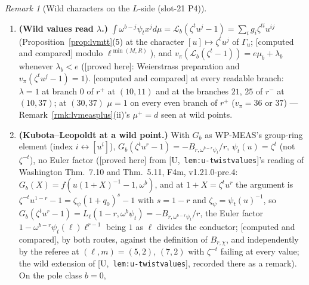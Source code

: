 \documentclass[11pt]{article}
\theoremstyle{remark}
\newtheorem{remark}[theorem]{Remark}
\newcommand{\Ga}{\Gamma}
\newcommand{\PROVED}{\textsf{[proved here]}}
\newcommand{\CMPD}{\textsf{[computed and compared]}}   %
\newcommand{\Ucite}[1]{[U,~\texttt{#1}]}               %
\begin{document}
\begin{remark}[Wild characters on the $L$-side (slot-21 P4)]
\begin{enumerate}
  $\Phi(\{a/F,\infty\})=-\rho_n(\gamma)\Phi(\{u/F,\infty\})$, and $\gamma_{a,m}\gamma=S\,\gamma_{u,m}$ with $S=\bigl(\begin{smallmatrix}0&-1\\1&0\end{smallmatrix}\bigr)$, while
  $\langle\rho_n(S)v,u^{\vee}_{n-j}\rangle=(-1)^{j}\langle v,u^{\vee}_{j}\rangle$ ($u_t\mapsto(-1)^{t}u_{n-t}$); summing against $\bar\chi(a)=\chi(-1)\chi(u)$ gives
  $\lambda_{\chi,j}(P)=-\chi(-1)(-1)^{j}\lambda_{\bar\chi,n-j}(P)$ for \emph{every} $P\in W$, which is $-\varepsilon\lambda_{\bar\chi,n-j}(P)$ wherever either side is non-zero
  ($\chi(-1)(-1)^{j}=\varepsilon$ there); checked by the referee on a generic $P\in W$: $0/176$ at $(10,5)$, $0/1100$ at $(10,11)$, $m=2$. Consequence (\CMPD): the control
  ``$\chi$ for $\bar\chi$'' coincides with the true value exactly at $j=n/2$, for the $\chi$ with $\chi(-1)(-1)^{n/2}=\varepsilon$, and nowhere else.
\item \textbf{(Wild values read $\lambda$.)} $\int\omega^{b-j}\psi_tx^{j}d\mu=\mathcal L_b(\zeta^{t}u^{j}-1)=\sum_ig_i\zeta^{ti}u^{ij}$ (Proposition~\ref{prop:lvmtt}(5) at the character $[u]\mapsto\zeta^{t}u^{j}$ of
  $\Ga_u$; \CMPD{} modulo $\ell^{\min(M,R)}$), and $v_\pi(\mathcal L_b(\zeta^{t}-1))=e\mu_b+\lambda_b$ whenever $\lambda_b<e$ (\PROVED: Weierstrass preparation and $v_\pi(\zeta^{t}u^{j}-1)=1$). \CMPD{} at
  every readable branch: $\lambda=1$ at branch $0$ of $r^{+}$ at $(10,11)$ and at the branches $21$, $25$ of $r^{-}$ at $(10,37)$; at $(30,37)$ $\mu=1$ on every even branch of $r^{+}$
  ($v_\pi=36$ or $37$) --- Remark~\ref{rmk:lvmeasplus}(ii)'s $\mu^{+}=d$ seen at wild points.
\item \textbf{(Kubota--Leopoldt at a wild point.)} With $G_b$ as WP-MEAS's group-ring element (index $i\leftrightarrow[u^{i}]$), $G_b(\zeta^{t}u^{r}-1)=-B_{r,\omega^{b-r}\psi_t}/r$, $\psi_t(u)=\zeta^{t}$ (not
  $\zeta^{-t}$), no Euler factor (\PROVED{} from \Ucite{lem:u-twistvalues}'s reading of Washington Thm.~7.10 and Thm.~5.11, F4m, v1.21.0-pre.4: $G_b(X)=f(u(1+X)^{-1}-1,\omega^{b})$, and at
  $1+X=\zeta^{t}u^{r}$ the argument is $\zeta^{-t}u^{1-r}-1=\zeta_\psi(1+q_0)^{s}-1$ with $s=1-r$ and $\zeta_\psi=\psi_t(u)^{-1}$, so $G_b(\zeta^{t}u^{r}-1)=L_\ell(1-r,\omega^{b}\psi_t)=-B_{r,\omega^{b-r}\psi_t}/r$,
  the Euler factor $1-\omega^{b-r}\psi_t(\ell)\ell^{r-1}$ being $1$ as $\ell$ divides the conductor; \CMPD, by both routes, against the definition of $B_{r,\chi}$, and independently by the referee at
  $(\ell,m)=(5,2)$, $(7,2)$ with $\zeta^{-t}$ failing at every value; the wild extension of \Ucite{lem:u-twistvalues}, recorded there as a remark). On the pole class $b=0$,

\end{enumerate}
\end{remark}
\end{document}
